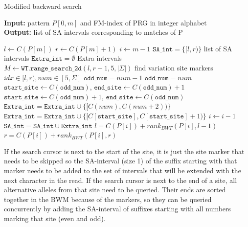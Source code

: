 \documentclass[runningheads,a4paper]{llncs}
\begin{document}
\begin{algorithm}[H]
\caption{Modified backward search} \label{bsearch}
\textbf{Input:} \textrm{pattern} $P[0,m]$ \textrm{and FM-index of PRG in integer alphabet}\\
\textbf{Output:} \textrm{list of SA intervals corresponding to matches of P} 
\begin{algorithmic}[1]
\State $l \gets C(P[m])$
\State $r \gets C(P[m]+1)$
\State $i \gets m-1$
\State $\texttt{SA\char`_int}=\{[l,r)\}$ \Comment list of SA intervals
\State $\texttt{Extra\char`_int}=\emptyset$   \Comment Extra intervals
\ForAll {$[l,r) \in \texttt{SA\char`_int}$} 
\State $M \gets \texttt{WT.range\char`_search\char`_2d} (l,r-1,5,|\Sigma|)$ \Comment find variation site markers
  \Comment $ idx\in [l,r), num\in[5,\Sigma]$
\State $\texttt{odd\char`_num}=num-1$
\Else
\State $\texttt{odd\char`_num}=num$
\EndIf
{}
\State $\texttt{start\char`_site} \gets C(\texttt{odd\char`_num})$, $\texttt{end\char`_site} \gets C(\texttt{odd\char`_num})+1$
\Else 
\State $\texttt{start\char`_site} \gets C(\texttt{odd\char`_num})+1$, $\texttt{end\char`_site} \gets C(\texttt{odd\char`_num})$
\EndIf
{}
\State $\texttt{Extra\char`_int}=\texttt{Extra\char`_int} \cup \{[C(num),C(num+2))\}$
\Else
\State $\texttt{Extra\char`_int}=\texttt{Extra\char`_int} \cup \{[C[\texttt{start\char`_site}], C[\texttt{start\char`_site}]+1)\}$
\EndIf
\EndFor
\EndFor
\State $i \gets i-1$
\State $\texttt{SA\char`_int}=\texttt{SA\char`_int} \cup \texttt{Extra\char`_int}$
\ForAll {$[l,r) \in \texttt{SA\char`_int}$} 
\State $l=C(P[i])+rank_{BWT}(P[i],l-1)$
\State $r=C(P[i])+rank_{BWT}(P[i],r)$
\EndFor
\EndWhile
\end {algorithmic}
\end{algorithm}


If the search cursor is next to the start of the site, it is just the site marker that needs to be skipped so the SA-interval (size 1) of the suffix starting with that marker needs to be added to the set of intervals that will be extended with the next character in the read. If the search cursor is next to the end of a site, all alternative alleles from that site need to be queried. Their ends are sorted together in the BWM because of the markers, so they can be queried concurrently by adding the SA-interval of suffixes starting with all numbers marking that site (even and odd). 
\end{document}
